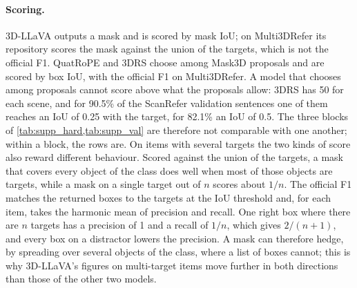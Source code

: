 \paragraph{Scoring.}
3D-LLaVA outputs a mask and is scored by mask IoU; on Multi3DRefer its repository scores the mask against the union of the targets, which is not the official F1.
QuatRoPE and 3DRS choose among Mask3D proposals and are scored by box IoU, with the official F1 on Multi3DRefer.
A model that chooses among proposals cannot score above what the proposals allow: 3DRS has 50 for each scene, and for 90.5\% of the ScanRefer validation sentences one of them reaches an IoU of 0.25 with the target, for 82.1\% an IoU of 0.5.
The three blocks of \cref{tab:supp_hard,tab:supp_val} are therefore not comparable with one another; within a block, the rows are.
On items with several targets the two kinds of score also reward different behaviour.
Scored against the union of the targets, a mask that covers every object of the class does well when most of those objects are targets, while a mask on a single target out of $n$ scores about $1/n$.
The official F1 matches the returned boxes to the targets at the IoU threshold and, for each item, takes the harmonic mean of precision and recall.
One right box where there are $n$ targets has a precision of 1 and a recall of $1/n$, which gives $2/(n+1)$, and every box on a distractor lowers the precision.
A mask can therefore hedge, by spreading over several objects of the class, where a list of boxes cannot; this is why 3D-LLaVA's figures on multi-target items move further in both directions than those of the other two models.



